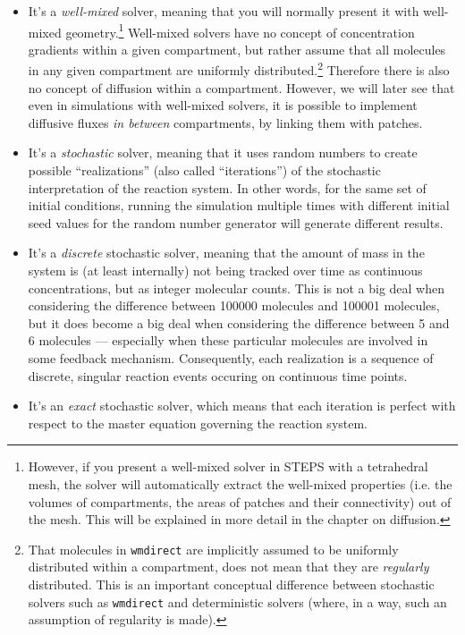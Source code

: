 \documentclass[a4paper,12pt]{book}
\begin{document}
\begin{itemize}
\item It's a \emph{well-mixed} solver, meaning that you will normally present it with well-mixed geometry.\footnote{However, if you present a well-mixed solver in STEPS with a tetrahedral mesh, the solver will automatically extract the well-mixed properties (i.e. the volumes of compartments, the areas of patches and their connectivity) out of the mesh. This will be explained in more detail in the chapter on diffusion.} Well-mixed solvers have no concept of concentration gradients within a given compartment, but rather assume that all molecules in any given compartment are uniformly distributed.\footnote{That molecules in \texttt{wmdirect} are implicitly assumed to be uniformly distributed within a compartment, does not mean that they are \emph{regularly} distributed. This is an important conceptual difference between stochastic solvers such as \texttt{wmdirect} and deterministic solvers (where, in a way, such an assumption of regularity is made).} Therefore there is also no concept of diffusion within a compartment. However, we will later see that even in simulations with well-mixed solvers, it is possible to implement diffusive fluxes \emph{in between} compartments, by linking them with patches.
\item It's a \emph{stochastic} solver, meaning that it uses random numbers to create possible ``realizations'' (also called ``iterations'') of the stochastic interpretation of the reaction system. In other words, for the same set of initial conditions, running the simulation multiple times with different initial seed values for the random number generator will generate different results. 
\item It's a \emph{discrete} stochastic solver, meaning that the amount of mass in the system is (at least internally) not being tracked over time as continuous concentrations, but as integer molecular counts. This is not a big deal when considering the difference between 100000 molecules and 100001 molecules, but it does become a big deal when considering the difference between 5 and 6 molecules --- especially when these particular molecules are involved in some feedback mechanism. Consequently, each realization is a sequence of discrete, singular reaction events occuring on continuous time points.
\item It's an \emph{exact} stochastic solver, which means that each iteration is perfect with respect to the master equation governing the reaction system. 
\end{itemize}
\end{document}

